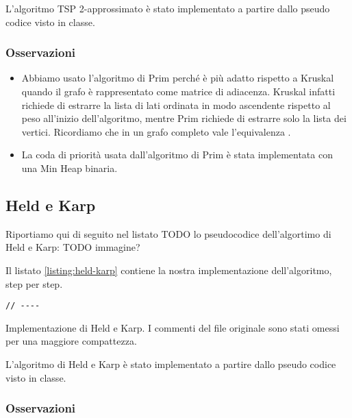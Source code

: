 \noindent L'algoritmo TSP 2-approssimato è stato implementato a partire dallo pseudo codice visto in classe. \\

\subsubsection{Osservazioni}

\begin{itemize}
    \item Abbiamo usato l'algoritmo di Prim perché è più adatto rispetto a Kruskal quando il grafo è rappresentato come matrice di adiacenza. Kruskal infatti richiede di estrarre la lista di lati ordinata in modo ascendente rispetto al peso all'inizio dell'algoritmo, mentre Prim richiede di estrarre solo la lista dei vertici. Ricordiamo che in un grafo completo vale l'equivalenza \complexityCompleteGraph{}.
    
    \item La coda di priorità usata dall'algoritmo di Prim è stata implementata con una Min Heap binaria.
\end{itemize}

\subsection{Held e Karp}

Riportiamo qui di seguito nel listato TODO lo pseudocodice dell'algortimo di Held e Karp:
TODO immagine?

\noindent Il listato \ref{listing:held-karp} contiene la nostra implementazione dell'algoritmo, step per step.

\begin{listing}[!ht]
\begin{verbatim}
// ----

\end{verbatim}
\caption{Implementazione di Held e Karp. I commenti del file originale sono stati omessi per una maggiore compattezza.}
\label{listing:held-karp}
\end{listing}

\noindent L'algoritmo di Held e Karp è stato implementato a partire dallo pseudo codice visto in classe. \\

\subsubsection{Osservazioni}

